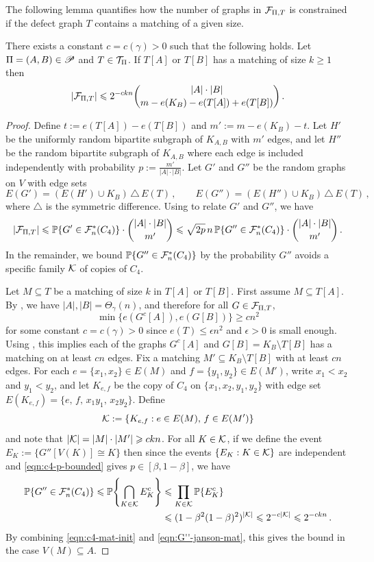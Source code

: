 The following lemma quantifies how the number of graphs in ${\mathcal F}_{\Pi,T}$ is constrained if the defect graph $T$ contains a matching of a given size.

\begin{lemma}\label{lemma:c4-matching}
There exists a constant $c=c(\gamma)>0$ such that the following holds. Let $\Pi=(A,B)\in{\mathscr P}$ and $T\in{\mathcal T}_\Pi$. If $T[A]$ or $T[B]$ has a matching of size $k\geq1$ then
$$|{\mathcal F}_{\Pi,T}|\leqslant 2^{-ckn}\binom{|A|\cdot|B|}{m-e(K_B)-e(T[A])+e(T[B])}\,.$$
\end{lemma}
\begin{proof}
Define $t:=e(T[A])-e(T[B])$ and $m':=m-e(K_B)-t$. Let $H'$ be the uniformly random bipartite subgraph of $K_{A,B}$ with $m'$ edges, and let $H''$ be the random bipartite subgraph of $K_{A,B}$ where each edge is included independently with probability $p:=\frac{m'}{|A|\cdot|B|}$. Let $G'$ and $G''$ be the random graphs on $V$ with edge sets
$$E(G')=(E(H')\cup K_B)\,\triangle\,E(T)\,,\qquad E(G'')=(E(H'')\cup K_B)\,\triangle\,E(T)\,,$$
where $\triangle$ is the symmetric difference. Using \cite[Lemma~A.4]{perkins2025typical} to relate $G'$ and $G''$, we have
\begin{equation}\label{eqn:c4-mat-init}
|{\mathcal F}_{\Pi,T}|\leqslant{\mathbb P}\{G'\in{\mathcal F}^\ast_n(C_4)\}\cdot\binom{|A|\cdot|B|}{m'}\leqslant\sqrt{2p}\,n\,{\mathbb P}\{G''\in{\mathcal F}^\ast_n(C_4)\}\cdot\binom{|A|\cdot|B|}{m'}\,.
\end{equation}
In the remainder, we bound ${\mathbb P}\{G''\in{\mathcal F}^\ast_n(C_4)\}$ by the probability $G''$ avoids a specific family ${\mathcal K}$ of copies of $C_4$.

Let $M\subseteq T$ be a matching of size $k$ in $T[A]$ or $T[B]$. First assume $M\subseteq T[A]$. By , we have $|A|,|B|=\Theta_\gamma(n)$, and therefore for all $G\in{\mathcal F}_{\Pi,T}$,
$$\min\{e(G^c[A]),e(G[B])\}\geq c n^2$$
for some constant $c=c(\gamma)>0$ since $e(T)\leq\epsilon n^2$ and $\epsilon>0$ is small enough. Using \cite[Lemma~A.3]{perkins2025typical}, this implies each of the graphs $G^c[A]$ and $G[B]=K_B\setminus T[B]$ has a matching on at least $cn$ edges. Fix a matching $M'\subseteq K_B\setminus T[B]$ with at least $cn$ edges. For each $e=\{x_1,x_2\}\in E(M)$ and $f=\{y_1,y_2\}\in E(M')$, write
$x_1<x_2$ and $y_1<y_2$, and let $K_{e,f}$ be the copy of $C_4$ on
$\{x_1,x_2,y_1,y_2\}$ with edge set $E(K_{e,f})=\{e,\,f,\,x_1y_1,\,x_2y_2\}$. Define
$${\mathcal K}:=\{K_{e,f}:e\in E(M),\,f\in E(M')\}$$
and note that $|{\mathcal K}|=|M|\cdot|M'|\geqslant ckn$. For all $K\in{\mathcal K}$, if we define the event $E_K:=\{G''[V(K)]\cong K\}$ then since the events $\{E_K:K\in{\mathcal K}\}$ are independent and \eqref{eqn:c4-p-bounded} gives $p\in[\beta,1-\beta]$, we have
\begin{equation}\label{eqn:G''-janson-mat}
\begin{aligned}
{\mathbb P}\{G''\in{\mathcal F}^\ast_n(C_4)\}\leqslant{\mathbb P}\!\left\{\bigcap_{K\in{\mathcal K}}E_K^c\right\} &\leqslant \prod_{K\in{\mathcal K}}{\mathbb P}\{E_K^c\} \\
&\leqslant (1-\beta^2(1-\beta)^2)^{|{\mathcal K}|}\leqslant2^{-c|{\mathcal K}|}\leqslant2^{-ckn}\,.
\end{aligned}
\end{equation}
By combining \eqref{eqn:c4-mat-init} and \eqref{eqn:G''-janson-mat}, this gives the bound in the case $V(M)\subseteq A$.


\end{proof}
